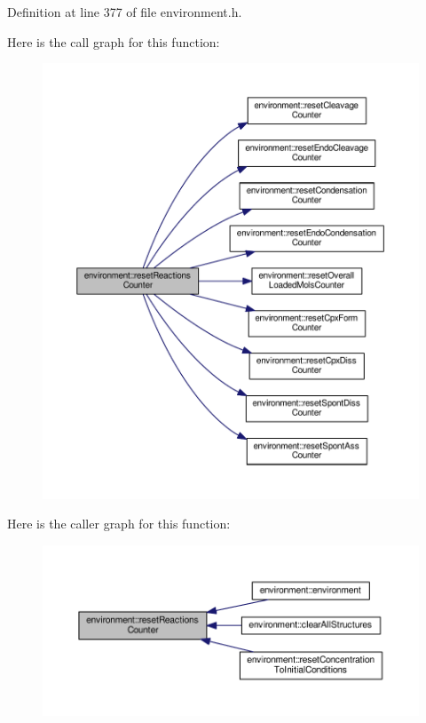 Definition at line 377 of file environment.\-h.



Here is the call graph for this function\-:\nopagebreak
\begin{figure}[H]
\begin{center}
\leavevmode
\includegraphics[width=350pt]{a00003_a5c8713237992b28c39199a7aea3f9ea0_cgraph}
\end{center}
\end{figure}




Here is the caller graph for this function\-:\nopagebreak
\begin{figure}[H]
\begin{center}
\leavevmode
\includegraphics[width=350pt]{a00003_a5c8713237992b28c39199a7aea3f9ea0_icgraph}
\end{center}
\end{figure}


